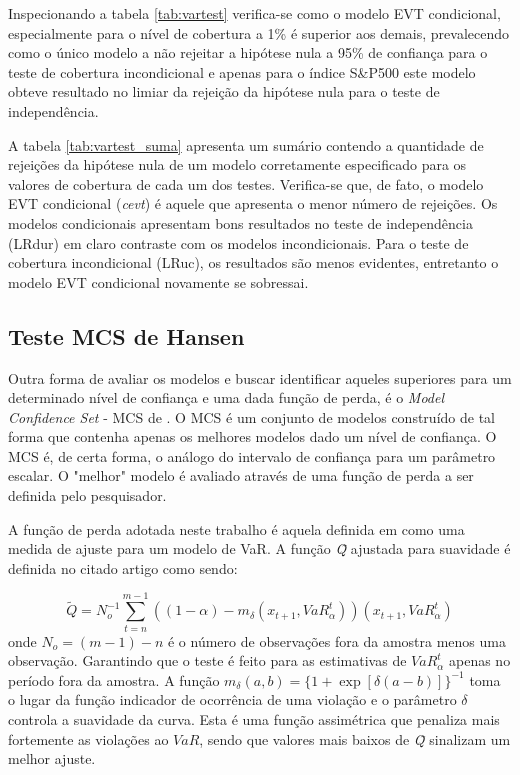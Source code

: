 \documentclass[review]{elsarticle}
\theoremstyle{definition}
\begin{document}


Inspecionando a tabela \ref{tab:vartest} verifica-se como o modelo EVT condicional, especialmente para o nível de cobertura a 1\% é superior aos demais, prevalecendo como o único modelo a não rejeitar a hipótese nula a 95\% de confiança para o teste de cobertura incondicional e apenas para o índice S\&P500 este modelo obteve resultado no limiar da rejeição da hipótese nula para o teste de independência.

A tabela \ref{tab:vartest_suma} apresenta um sumário contendo a quantidade de rejeições da hipótese nula de um modelo corretamente especificado para os valores de cobertura de cada um dos testes. Verifica-se que, de fato, o modelo EVT condicional (\emph{cevt}) é aquele que apresenta o menor número de rejeições. Os modelos condicionais apresentam bons resultados no teste de independência (LRdur) em claro contraste com os modelos incondicionais. Para o teste de cobertura incondicional (LRuc), os resultados são menos evidentes, entretanto o modelo EVT condicional novamente se sobressai.



\subsection{Teste MCS de Hansen}
\label{sec:mcs}

Outra forma de avaliar os modelos e buscar identificar aqueles superiores para um determinado nível de confiança e uma dada função de perda, é o \emph{Model Confidence Set} - MCS de \cite{Hansen2011}. O MCS é um conjunto de modelos construído de tal forma que contenha apenas os melhores modelos dado um nível de confiança. O MCS é, de certa forma, o análogo do intervalo de confiança para um parâmetro escalar. O "melhor" modelo é avaliado através de uma função de perda a ser definida pelo pesquisador.

A função de perda adotada neste trabalho é aquela definida em \cite{Gonzalez-Rivera2004} como uma medida de ajuste para um modelo de VaR. A função \emph{\~{Q}} ajustada para suavidade é definida no citado artigo como sendo:

\begin{equation}
	\tilde{Q} = N_o^{-1}\sum_{t=n}^{m-1}((1-\alpha)-m_\delta(x_{t+1}, VaR^t_\alpha))(x_{t+1}, VaR^t_\alpha)
\end{equation}
onde $N_o = (m-1)-n$ é o número de observações fora da amostra menos uma observação. Garantindo que o teste é feito para as estimativas de $VaR^t_\alpha$ apenas no período fora da amostra. A função $m_\delta(a, b)=\{1+\exp[\delta(a-b)]\}^{-1}$ toma o lugar da função indicador de ocorrência de uma violação e o parâmetro $\delta$ controla a suavidade da curva. Esta é uma função assimétrica que penaliza mais fortemente as violações ao $VaR$, sendo que valores mais baixos de \emph{\~{Q}} sinalizam um melhor ajuste.
\end{document}
